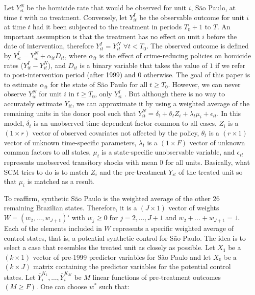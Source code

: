 \documentclass[a4paper,11pt]{article}
\begin{document}
Let $Y_{it}^N$ be the homicide rate that would be observed for unit $i$, S\~{a}o Paulo, at time $t$ with no treatment. Conversely, let $Y_{it}^I$ be the observable outcome for unit $i$ at time $t$ had it been subjected to the treatment in periods $T_{0} + 1$ to $T$. An important assumption is that the treatment has no effect on unit $i$ before the date of intervention, therefore $Y_{it}^I = Y_{it}^N$ $\forall t < T_{0}$. The observed outcome is defined by $Y_{it}^I = Y_{it}^N + \alpha_{it}D_{it}$, where $\alpha_{it}$ is the effect of crime-reducing policies on homicide rates ($Y_{it}^I - Y_{it}^N$), and $D_{it}$ is a binary variable that takes the value of $1$ if we refer to post-intervention period (after 1999) and $0$ otherwise. The goal of this paper is to estimate $\alpha_{it}$ for the state of S\~{a}o Paulo for all $t \geq T_0$. However, we can never observe $Y_{it}^N$ for unit $i$ in $t \geq T_0$, only $Y_{it}^I$ \citep{holland1986}. But although there is no way to accurately estimate $Y_{it}$, we can approximate it by using a weighted average of the remaining units in the donor pool such that $Y_{it}^N = \delta_{t} + \theta_{t}Z_{i} + \lambda_{t}\mu_{i} + \epsilon_{it}$. In this model, $\delta_{t}$ is an unobserved time-dependent factor common to all cases, $Z_{i}$ is a $(1 \times r)$ vector of observed covariates not affected by the policy, $\theta_{t}$ is a $(r \times 1)$ vector of unknown time-specific parameters, $\lambda_{t}$ is a $(1 \times F)$ vector of unknown common factors to all states, $\mu_{i}$ is a state-specific unobservable variable, and $\epsilon_{it}$ represents unobserved transitory shocks with mean $0$ for all units. Basically, what SCM tries to do is to match $Z_{i}$ and the pre-treatment $Y_{it}$ of the treated unit so that $\mu_{i}$ is matched as a result.

To reaffirm, synthetic S\~{a}o Paulo is the weighted average of the other 26 remaining Brazilian states. Therefore, it is a $(J \times 1)$ vector of weights $W = (w_2 , \dots, w_{J+1})'$ with $w_j \geq 0$ for $j = 2, \dots, J + 1$ and $w_2 + \dots + w_{J+1} = 1$. Each of the elements included in $W$ represents a specific weighted average of control states, that is, a potential synthetic control for S\~{a}o Paulo. The idea is to select a case that resembles the treated unit as closely as possible. Let $X_{1}$ be a $(k \times 1)$ vector of pre-1999 predictor variables for S\~{a}o Paulo and let $X_{0}$ be a $(k \times J)$ matrix containing the predictor variables for the potential control states. Let $\bar{Y}_{i}^{K_{1}}, \dots, \bar{Y}_{i}^{K_{M}}$ be $M$ linear functions of pre-treatment outcomes $(M \geq F)$. One can choose $w^*$ such that:
\end{document}
